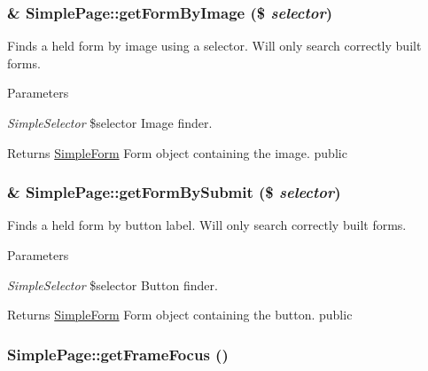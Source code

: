 \hypertarget{class_simple_page_a8a133c872f0f94987deb4193777a156e}{
\subsubsection[{getFormByImage}]{\setlength{\rightskip}{0pt plus 5cm}\& SimplePage::getFormByImage (\$ {\em selector})}}
\label{class_simple_page_a8a133c872f0f94987deb4193777a156e}
Finds a held form by image using a selector. Will only search correctly built forms. 
\begin{DoxyParams}{Parameters}
\item[{\em SimpleSelector}]\$selector Image finder. \end{DoxyParams}
\begin{DoxyReturn}{Returns}
\hyperlink{class_simple_form}{SimpleForm} Form object containing the image.  public 
\end{DoxyReturn}
\hypertarget{class_simple_page_a88cb8668be67ea78d4741b630708bd55}{
\subsubsection[{getFormBySubmit}]{\setlength{\rightskip}{0pt plus 5cm}\& SimplePage::getFormBySubmit (\$ {\em selector})}}
\label{class_simple_page_a88cb8668be67ea78d4741b630708bd55}
Finds a held form by button label. Will only search correctly built forms. 
\begin{DoxyParams}{Parameters}
\item[{\em SimpleSelector}]\$selector Button finder. \end{DoxyParams}
\begin{DoxyReturn}{Returns}
\hyperlink{class_simple_form}{SimpleForm} Form object containing the button.  public 
\end{DoxyReturn}
\hypertarget{class_simple_page_a456eebe87832187c07378c9ecdbd6d3d}{
\subsubsection[{getFrameFocus}]{\setlength{\rightskip}{0pt plus 5cm}SimplePage::getFrameFocus ()}}
\label{class_simple_page_a456eebe87832187c07378c9ecdbd6d3d}
